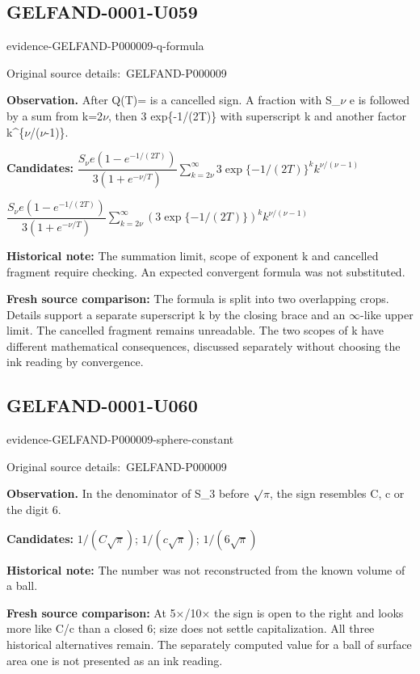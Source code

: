 \documentclass[11pt]{article}
\newcommand{\EvidenceBlock}[4]{%
 \par\smallskip\noindent\begin{minipage}{\linewidth}
 \begin{minipage}[t]{.47\linewidth}\vspace{0pt}\centering
 \csname evidence-#1-#2\endcsname\par
 {\scriptsize\SourceCropCaption\ #1}\par
 \end{minipage}\hfill
 \begin{minipage}[t]{.49\linewidth}\vspace{0pt}\raggedright
 {\small\color{orange!65!black}\textbf{#4} #3}\par
 \end{minipage}
 \end{minipage}\par\smallskip}
\newcommand{\SourceCropCaption}{Original source details:}\newcommand{\ReadingCaption}{Uncertain reading.}\newcommand{\IncompleteCaption}{Undeciphered passage.}\newcommand{\DiagramCaption}{Diagram and typed description.}
\begin{document}
\subsection*{GELFAND-0001-U059}
\EvidenceBlock{GELFAND-P000009}{q-formula}{After Q(T)= is a cancelled sign. A fraction with S\_\(\nu\) e is followed by a sum from k=2\(\nu\), then 3 exp\{-1/(2T)\} with superscript k and another factor k\textasciicircum{}\{\(\nu\)/(\(\nu\)-1)\}.}{Observation.}
\par\smallskip\noindent\textbf{Candidates: } \(\dfrac{S_\nu e(1-e^{-1/(2T)})}{3(1+e^{-\nu/T})}\sum_{k=2\nu}^{\infty}3\exp\{-1/(2T)\}^k k^{\nu/(\nu-1)}\)\par\smallskip\(\dfrac{S_\nu e(1-e^{-1/(2T)})}{3(1+e^{-\nu/T})}\sum_{k=2\nu}^{\infty}(3\exp\{-1/(2T)\})^k k^{\nu/(\nu-1)}\)\par
\par\smallskip\noindent\textbf{Historical note: } The summation limit, scope of exponent k and cancelled fragment require checking. An expected convergent formula was not substituted.\par
\par\smallskip\noindent\textbf{Fresh source comparison: } The formula is split into two overlapping crops. Details support a separate superscript k by the closing brace and an \(\infty\)-like upper limit. The cancelled fragment remains unreadable. The two scopes of k have different mathematical consequences, discussed separately without choosing the ink reading by convergence.\par

\subsection*{GELFAND-0001-U060}
\EvidenceBlock{GELFAND-P000009}{sphere-constant}{In the denominator of S\_3 before \(\sqrt{\vphantom{x}}\)\(\pi\), the sign resembles C, c or the digit 6.}{Observation.}
\par\smallskip\noindent\textbf{Candidates: } \(1/(C\sqrt\pi)\); \(1/(c\sqrt\pi)\); \(1/(6\sqrt\pi)\)\par
\par\smallskip\noindent\textbf{Historical note: } The number was not reconstructed from the known volume of a ball.\par
\par\smallskip\noindent\textbf{Fresh source comparison: } At 5×/10× the sign is open to the right and looks more like C/c than a closed 6; size does not settle capitalization. All three historical alternatives remain. The separately computed value for a ball of surface area one is not presented as an ink reading.\par
\end{document}
